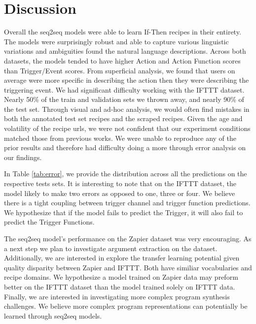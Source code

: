 \documentclass[letterpaper]{article} %
\begin{document}
\section{Discussion}
Overall the seq2seq models were able to learn If-Then recipes in their entirety. The models were surprisingly robust and able to capture various linguistic variations and ambiguities found the natural language descriptions. Across both datasets, the models tended to have higher Action and Action Function scores than Trigger/Event scores. From superficial analysis, we found that users on average were more specific in describing the action then they were describing the triggering event.  We had significant difficulty working with the IFTTT dataset. Nearly 50\% of the train and validation sets we thrown away, and nearly 90\% of the test set. Through visual and ad-hoc analysis, we would often find mistakes in both the annotated test set recipes and the scraped recipes. Given the age and volatility of the recipe urls, we were not confident that our experiment conditions matched those from previous works. We were unable to reproduce any of the prior results and therefore had difficulty doing a more through error analysis on our findings.

In Table \ref{tab:error}, we provide the distribution across all the predictions on the respective tests sets. It is interesting to note that on the IFTTT dataset, the model likely to make two errors as opposed to one, three or four. We believe there is a tight coupling between trigger channel and trigger function predictions. We hypothesize that if the model fails to predict the Trigger, it will also fail to predict the Trigger Functions.

The seq2seq model's performance on the Zapier dataset was very encouraging. As a next step we plan to investigate argument extraction on the dataset. Additionally, we are interested in explore the transfer learning potential given quality disparity between Zapier and IFTTT. Both have similiar vocabularies and recipe domains. We hypothesize a model trained on Zapier data may preform better on the IFTTT dataset than the model trained solely on IFTTT data. Finally, we are interested in investigating more complex program synthesis challenges. We believe more complex program representations can potentially be learned through seq2seq models.
\end{document}
